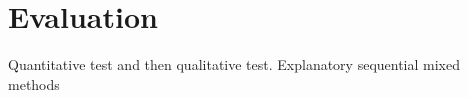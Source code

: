 \begin{comment}\section{Design}\label{designMethod}
To come up with a design that can be implemented in a prototype that should be able to answer the final problem statement (see \autoref{sec:FPS}), multiple idea generation phases had to be conducted. As a part of these phases, an ideation workshop was run in collaboration with children from a Sankt Annæ 4th grade class (see \autoref{sec:workshop}).\\\\
some design proposals based on the aforementioned feedback will be created, and analyzed using a method akin to the Crawford slip method\cite{crawfordSlip}. To do this a lay out of the drawn ideas will be placed on a table, and every group member will write down what they think are positive and relevant elements of each idea on slips of paper. These slips will then be analyzed and be used to define the next iteration of our design.

\subsection{Usability}
The first usability test was conducted during the workshop with the children at Skt. Annæ school in the form of an early paper prototype. The feedback provided was brought back and used to create the next iteration of the prototype. \\
The next iteration was created without contact to the users due to not having the time and resources available. This iteration would be implemented and made ready for the initial usability test which will be conducted on Aalborg university Copenhagen.
The usability test will be in a controlled setting using the system usability scale (SUS) method, observation method and a think aloud test. The goal is to find out how the users perform on typical tasks, that are designed for them (the target group). 
The usability test will first conduct information from observation and a think aloud test. There will be 1-2 observers and the whole interaction should be exploratory for the tester. \end{comment}
	
\section{Evaluation}
Quantitative test and then qualitative test.
Explanatory sequential mixed methods\cite[p.~21]{bjoernerBog}

